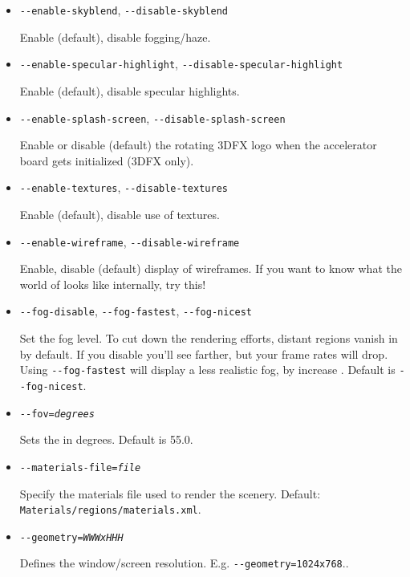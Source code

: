 \begin{itemize}
{\begin{itemize}
  \item{\texttt{-$ $-enable-skyblend}, \texttt{-$ $-disable-skyblend}}

  Enable (default), disable fogging/haze.

  \item{\texttt{-$ $-enable-specular-highlight}, \texttt{-$ $-disable-specular-highlight}}

  Enable (default), disable specular highlights.

  \item{\texttt{-$ $-enable-splash-screen}, \texttt{-$ $-disable-splash-screen}}

  Enable or disable (default) the rotating 3DFX logo when the accelerator board gets initialized (3DFX only).

  \item{\texttt{-$ $-enable-textures}, \texttt{-$ $-disable-textures}}

  Enable (default), disable use of textures.

  \item{\texttt{-$ $-enable-wireframe}, \texttt{-$ $-disable-wireframe}}

  Enable, disable (default) display of wireframes. If you want to know what the world of
  \FlightGear{} looks like internally, try this!

  \item{\texttt{-$ $-fog-disable}, \texttt{-$ $-fog-fastest}, \texttt{-$ $-fog-nicest}}

  Set the fog level. To cut down the rendering efforts, distant regions vanish in  by default.
  If you disable  you'll see farther, but your frame rates will drop. Using \texttt{-$ $-fog-fastest}
  will display a less realistic fog, by increase . Default is \texttt{-$ $-fog-nicest}.

  \item{\texttt{-$ $-fov={\it degrees}}}

  Sets the  in degrees. Default is 55.0.

  \item{\texttt{-$ $-materials-file={\it file}}}

  Specify the materials file used to render the scenery.
  Default: \texttt{Materials/regions/materials.xml}.

  \item{\texttt{-$ $-geometry={\it WWWxHHH}}}

  Defines the window/screen resolution. E.g. \texttt{-$ $-geometry=1024x768}..


\end{itemize}}
\end{itemize}
